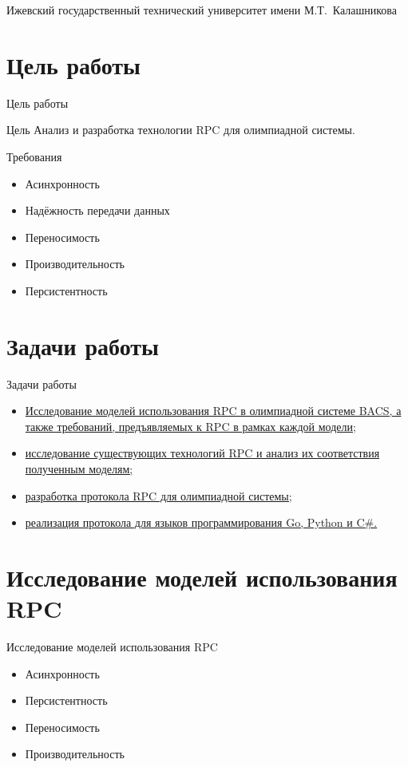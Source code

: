 \documentclass[xetex,mathserif,serif,10pt]{beamer}
\newenvironment{sframe}[2]{\section{#1}\begin{frame}[label=#2]{#1}}{\end{frame}}
\begin{document}
    \title[RPC]{\titletext}
    \author[Филиппов]{А.~Филиппов}
    \institute
    {
        Ижевский государственный технический университет имени М.Т.~Калашникова
    }

    

    \begin{sframe}{Цель работы}{target}
        \begin{block}{Цель}
            Анализ и разработка технологии RPC для олимпиадной системы.
        \end{block}

        \begin{block}{Требования}
            \begin{itemize}
                \item Асинхронность
                \item Надёжность передачи данных
                \item Переносимость
                \item Производительность
                \item Персистентность
            \end{itemize}
        \end{block}
    \end{sframe}

    \begin{sframe}{Задачи работы}{problems}
        \begin{itemize}
            \item \hyperlink{analysis}{Исследование моделей использования RPC
                в олимпиадной системе BACS, а также требований,
                предъявляемых к RPC в рамках каждой модели};
            \item \hyperlink{review}{исследование существующих технологий RPC
                и анализ их соответствия полученным моделям;}
            \item \hyperlink{protodev}{разработка протокола RPC
                для олимпиадной системы;}
            \item \hyperlink{binddev}{реализация протокола для языков
                программирования Go, Python и C\#.}
        \end{itemize}
    \end{sframe}

    \begin{sframe}{Исследование моделей использования RPC}{analysis}
        \begin{itemize}
            \item Асинхронность
            \item Персистентность
            \item Переносимость
            \item Производительность
        \end{itemize}
        \begin{figure}
            \centering
            \resizebox*{!}{0.6\textheight}{}
        \end{figure}
    \end{sframe}
\end{document}
